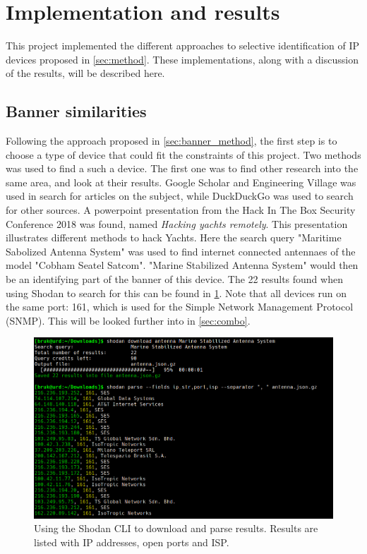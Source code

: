 \section{Implementation and results} \label{sec:results}
This project implemented the different approaches to selective identification of IP devices proposed in \cref{sec:method}. These implementations, along with a discussion of the results, will be described here. 

\subsection{Banner similarities}
Following the approach proposed in \cref{sec:banner_method}, the first step is to choose a type of device that could fit the constraints of this project. Two methods was used to find a such a device. The first one was to find other research into the same area, and look at their results. Google Scholar\cite{google_scholar} and Engineering Village\cite{engineering_village} was used in search for articles on the subject, while DuckDuckGo\cite{ddg} was used to search for other sources. A powerpoint presentation from the Hack In The Box Security Conference 2018 was found, named \textit{Hacking yachts remotely}. This presentation illustrates different methods to hack Yachts. Here the search query "Maritime Sabolized Antenna System" was used to find internet connected antennaes of the model "Cobham Seatel Satcom". 
"Marine Stabilized Antenna System" would then be an identifying part of the banner of this device. The 22 results found when using Shodan to search for this can be found in \cref{fig:banner_parsing}. Note that all devices run on the same port: 161, which is used for the Simple Network Management Protocol (SNMP). This will be looked further into in \cref{sec:combo}.

\begin{figure} [H]
    \centering
    \includegraphics[scale=0.4]{Figurer/banner_parsing.png}
    \caption{Using the Shodan CLI to download and parse results. Results are listed with IP addresses, open ports and ISP.}
    \label{fig:banner_parsing}
\end{figure}

